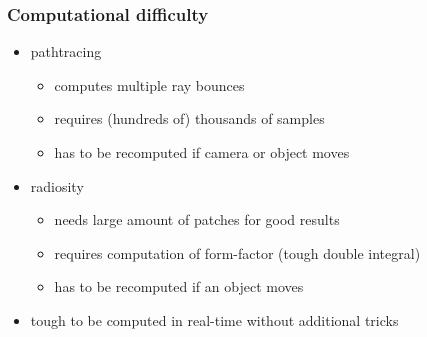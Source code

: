 \documentclass[aspectratio=169]{beamer}
\begin{document}
	\begin{frame}
		\frametitle{Computational difficulty}
		\begin{itemize}
			\item pathtracing 
				\begin{itemize}
					\item computes multiple ray bounces
					\item requires (hundreds of) thousands of samples 
					\item has to be recomputed if camera or object moves
				\end{itemize}
			\item radiosity
				\begin{itemize}
					\item needs large amount of patches for good results
					\item requires computation of form-factor (tough double integral)
					\item has to be recomputed if an object moves
				\end{itemize}
			\item tough to be computed in real-time without additional tricks
		\end{itemize}
	\end{frame}
\end{document}
